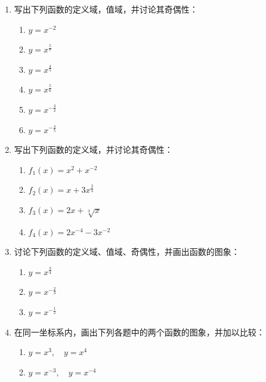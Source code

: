  \begin{enumerate}
     \item 写出下列函数的定义域，值域，并讨论其奇偶性：
 \begin{multicols}{2}
 \begin{enumerate}[(1)]
     \item $y=x^{-2}$
     \item $y=x^{\tfrac{5}{7}}$
     \item $y=x^{\tfrac{4}{5}}$
     \item $y=x^{\tfrac{5}{6}}$
     \item $y=x^{-\tfrac{3}{2}}$
     \item $y=x^{-\tfrac{4}{5}}$
 \end{enumerate}
 \end{multicols}
     \item 写出下列函数的定义域，并讨论其奇偶性：
 \begin{multicols}{2}
 \begin{enumerate}[(1)]
     \item $f_1(x)=x^2+x^{-2}$
     \item $f_2(x)=x+3x^{\tfrac{2}{3}}$
     \item $f_3(x)=2x+\sqrt[3]{x}$
     \item $f_4(x)=2x^{-4}-3x^{-2}$
 \end{enumerate}    
 \end{multicols}
 \item 讨论下列函数的定义域、值域、奇偶性，并画出函数的图象：
 \begin{multicols}{3}
 \begin{enumerate}[(1)]
     \item $y=x^{\tfrac{3}{4}}$
     \item $y=x^{-\tfrac{2}{3}}$
     \item $y=x^{-\tfrac{1}{2}}$
 \end{enumerate}
 \end{multicols}
 
 \item 在同一坐标系内，画出下列各题中的两个函数的图象，并加以比较：
 \begin{multicols}{2}
 \begin{enumerate}[(1)]
     \item $y=x^3,\quad y=x^4$
     \item $y=x^{-3},\quad y=x^{-4}$
 \end{enumerate}
 \end{multicols}
 

\end{enumerate}
